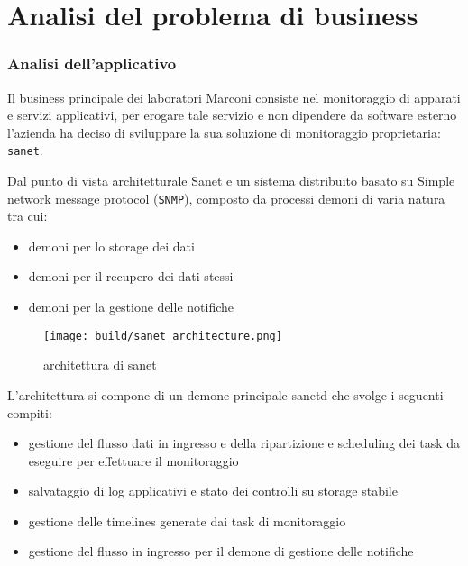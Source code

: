 \chapter{Analisi del problema di business}

\subsection{Analisi dell'applicativo}
Il business principale dei laboratori Marconi consiste nel monitoraggio di apparati e servizi applicativi, per erogare tale servizio e non dipendere da software esterno l'azienda ha deciso di sviluppare la sua soluzione di monitoraggio proprietaria: \verb|sanet|.

Dal punto di vista architetturale Sanet e un sistema distribuito basato su Simple network message protocol (\verb|SNMP|), composto da processi demoni di varia natura tra cui:

\begin{itemize}
    \item demoni per lo storage dei dati
    \item demoni per il recupero dei dati stessi
    \item demoni per la gestione delle notifiche
\end{itemize}

\begin{figure}[H]
    \centering
    \texttt{[image: build/sanet\_architecture.png]}
    \caption{architettura di sanet}
    \label{fig:enter-label}
\end{figure}

L'architettura si compone di un demone principale sanetd che svolge i seguenti compiti:

\begin{itemize}
  \item gestione del flusso dati in ingresso e della ripartizione e scheduling dei task da eseguire per effettuare il monitoraggio
  \item salvataggio di log applicativi e stato dei controlli su storage stabile
  \item gestione delle timelines generate dai task di monitoraggio
  \item gestione del flusso in ingresso per il demone di gestione delle notifiche
\end{itemize}

